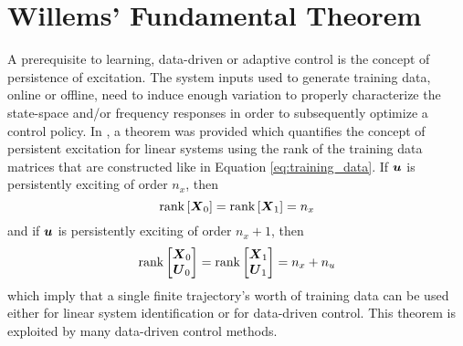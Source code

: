 \section{Willems' Fundamental Theorem}
A prerequisite to learning, data-driven or adaptive control is the concept of persistence of excitation.  The system inputs used to generate training data, online or offline, need to induce enough variation to properly characterize the state-space and/or frequency responses in order to subsequently optimize a control policy.  In \cite{willems2005note}, a theorem was provided which quantifies the concept of persistent excitation for linear systems using the rank of the training data matrices that are constructed like in Equation \eqref{eq:training_data}.  If $\vb*{u}$ is persistently exciting of order $n_{x}$, then
\begin{equation}
\label{eq:willems_1}
	\text{rank}\left[ \vb*{X}_{0} \right] = \text{rank}\left[ \vb*{X}_{1} \right] =  n_{x}
\end{equation}
and if $\vb*{u}$ is persistently exciting of order $n_{x} + 1$, then
\begin{equation}
\label{eq:willems_2}
	\text{rank} \begin{bmatrix} \vb*{X}_{0}\\ \vb*{U}_{0} \end{bmatrix}
		= \text{rank} \begin{bmatrix} \vb*{X}_{1}\\ \vb*{U}_{1} \end{bmatrix} = n_{x} + n_{u}
\end{equation}
which imply that a single finite trajectory's worth of training data can be used either for linear system identification or for data-driven control.  This theorem is exploited by many data-driven control methods.

